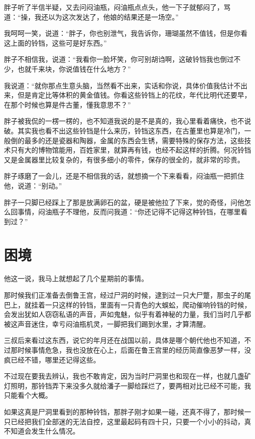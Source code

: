 胖子听了半信半疑，又去问闷油瓶，闷油瓶点点头，他一下子就郁闷了，骂道：“操，我还以为这次发达了，他娘的结果还是一场空。”

我呵呵一笑，说道：“胖子，你也别泄气，我告诉你，珊瑚虽然不值钱，但是你看这上面的铃铛，这些可是好东西。”

胖子不相信我，说道：“我看你一脸坏笑，你可别胡诌啊，这破铃铛我也倒过不少，也就千来块，你说值钱在什么地方？”

我说道：“就你那点生意头脑，当然看不出来，实话和你说，具体价值我估计不出来，但是肯定比等体积的黄金值钱。你看这些铃铛上的花纹，年代比明代还要早，在那个时候也算是件古董，懂我意思不？”

胖子被我侃的一楞一楞的，也不知道我说的是不是真的，我心里看着痛快，也不说破。其实我也看不出这些铃铛是什么来历，铃铛这东西，在古董里也算是冷门，一般倒的最多的还是瓷器和陶器，金属的东西会生锈，需要特殊的保存方法，这些技术只有大的博物馆能用，百姓家里，就算再有钱，也经不起这样的折腾。何况铃铛又是金属器里比较复杂的，有很多细小的零件，保存的很全的，就非常的珍贵。

胖子琢磨了一会儿，还是不相信我的话，就想摘一个下来看看，闷油瓶一把抓住他，说道：“别动。”

胖子一只脚已经踩上了那是放满卵石的盆，硬是被他拉了下来，觉的奇怪，问他怎么回事情，闷油瓶子不理他，反而问我道：“你还记得不记得这种铃铛，在哪里看到过？”

\chapter{困境}

他这一说，我马上就想起了几个星期前的事情。

那时候我们正准备去倒鲁王宫，经过尸洞的时候，逮到过一只大尸蹩，那虫子的尾巴上，就挂着一只这样的铃铛，里面有一只青色的大蜈蚣，爬动催响铃铛的时候，会发出犹如人窃窃私语的声音，声如鬼魅，似乎有着神秘的力量，我们当时几乎都被这声音迷住，幸亏闷油瓶机灵，一脚把我们踢到水里，才算清醒。

三叔后来看过这东西，说它的年月还在战国以前，具体是哪个朝代他也不知道，不过那时候事情危急，我也没放在心上，后面在鲁王宫里的经历简直像恶梦一样，没疯已经不错，哪里还记得这些。

不过现在要我去辨认，我也不敢肯定，因为当时尸洞里也和现在一样，也就几盏矿灯照明，那铃铛弄下来没多久就给潘子一脚给踩烂了，要两相对比已经不可能，我只能看个大概。

如果这真是尸洞里看到的那种铃铛，那胖子刚才如果一碰，还真不得了，那时候一只已经把我们全部迷的无法自控，这里最起码有四十只，只要一个小小的抖动，真不知道会发生什么情况。

